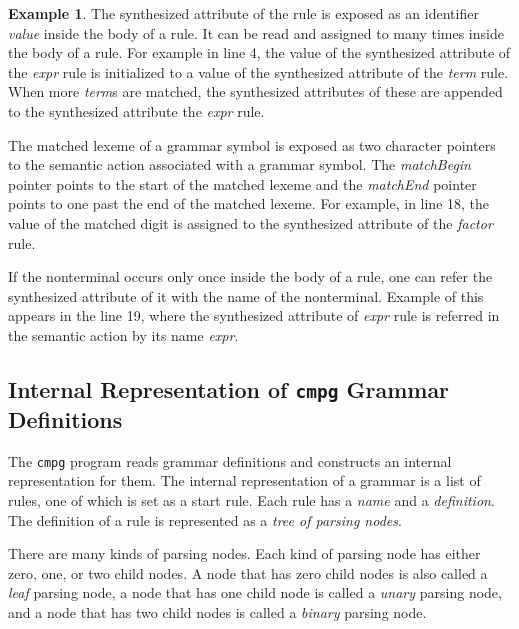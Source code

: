 \documentclass[a4paper,oneside,11pt]{book}
\theoremstyle{definition}
\newtheorem{exmp}{Example}[section]
\begin{document}
\begin{exmp}
The synthesized attribute of the rule is exposed as an identifier \emph{value} inside the body of a rule.
It can be read and assigned to many times inside the body of a rule.
For example in line 4, the value of the synthesized attribute of the \emph{expr} rule is initialized to a value of the synthesized attribute of the
\emph{term} rule. When more \emph{term}s are matched, the synthesized attributes of these are appended to the synthesized attribute the \emph{expr} rule.

The matched lexeme of a grammar symbol is exposed as two character pointers to the semantic action associated with a grammar symbol.
The \emph{matchBegin} pointer points to the start of the matched lexeme and the \emph{matchEnd} pointer points to one past the end of the matched lexeme.
For example, in line 18, the value of the matched digit is assigned to the synthesized attribute of the \emph{factor} rule.

If the nonterminal occurs only once inside the body of a rule, one can refer the synthesized attribute of it with the name of the nonterminal.
Example of this appears in the line 19, where the synthesized attribute of \emph{expr} rule is referred in the semantic action by its name \emph{expr}.
\end{exmp}

\subsection{Internal Representation of \texttt{cmpg} Grammar Definitions}

The \verb|cmpg| program reads grammar definitions and constructs an internal representation for them.
The internal representation of a grammar is a list of rules, one of which is set as a start rule.
Each rule has a \emph{name} and a \emph{definition}.
The definition of a rule is represented as a \emph{tree of parsing nodes}.

There are many kinds of parsing nodes. Each kind of parsing node has either zero, one, or two child nodes.
A node that has zero child nodes is also called a \emph{leaf} parsing node,
a node that has one child node is called a \emph{unary} parsing node,
and a node that has two child nodes is called a \emph{binary} parsing node.
\end{document}
